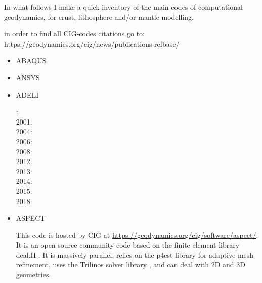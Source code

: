 
In what follows I make a quick inventory of the main codes of computational geodynamics, 
for crust, lithosphere and/or mantle modelling.

in order to find all CIG-codes citations go to: https://geodynamics.org/cig/news/publications-refbase/

\begin{itemize}

\item {\codefont ABAQUS} 

{\small
\noindent
\cite{brry01}
\cite{gedh02}
\cite{fumr03}
\cite{camg07}
\cite{kuhe09}
\cite{makh09}
\cite{camg10}
\cite{nalr12}
\cite{pevp15}
\cite{naam17}
\cite{naam18}
}

\item {\codefont ANSYS} 

\cite{nehe06}

\item {\codefont ADELI} 

{\small
{}: \cite{hajc97}\\
2001: \cite{chzh01}\\
2004: \cite{gocl04}\\
2006: \cite{vech06}\cite{golc06}\\
2008: \cite{boht08a}\cite{boht08b}\\
2012: \cite{gech12}\cite{gigh12}\\
2013: \cite{wahd13}\\
2014: \cite{cehg14}\\
2015: \cite{ceag15}\\
2018: \cite{cegm18}\cite{gehn18}
}

\item {\codefont ASPECT} 

This code is hosted by CIG at \url{https://geodynamics.org/cig/software/aspect/}. 
It is an open source community code based on the finite element library deal.II \cite{bahk07,arbc19}. 
It is massively parallel, relies on the p4est library for adaptive mesh refinement,
uses the Trilinos solver library \cite{hewi12}, and can deal with 2D and 3D geometries. 


\end{itemize}
